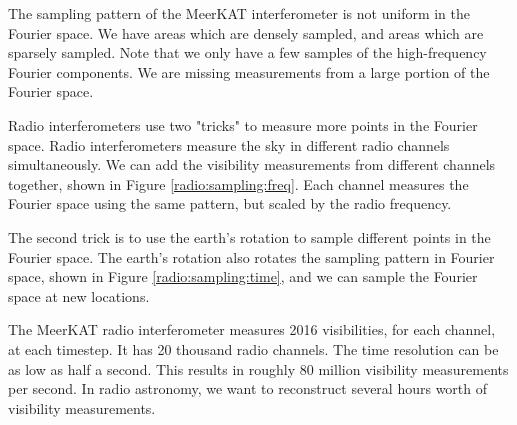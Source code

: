 The sampling pattern of the MeerKAT interferometer is not uniform in the Fourier space. We have areas which are densely sampled, and areas which are sparsely sampled. Note that we only have a few samples of the high-frequency Fourier components. We are missing measurements from a large portion of the Fourier space.

Radio interferometers use two "tricks" to measure more points in the Fourier space. Radio interferometers measure the sky in different radio channels simultaneously. We can add the visibility measurements from different channels together, shown in Figure \ref{radio:sampling:freq}. Each channel measures the Fourier space using the same pattern, but scaled by the radio frequency. 

The second trick is to use the earth's rotation to sample different points in the Fourier space. The earth's rotation also rotates the sampling pattern in Fourier space, shown in Figure \ref{radio:sampling:time}, and we can sample the Fourier space at new locations.

The MeerKAT radio interferometer measures 2016 visibilities, for each channel, at each timestep. It has 20 thousand radio channels. The time resolution can be as low as half a second. This results in roughly 80 million visibility measurements per second. In radio astronomy, we want to reconstruct several hours worth of visibility measurements. 

